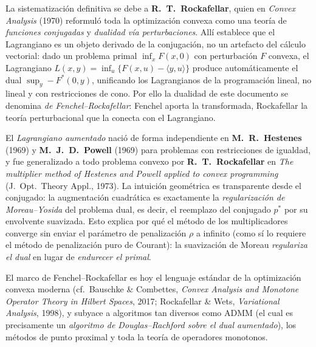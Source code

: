 \documentclass[12pt]{book}
\theoremstyle{definition}
\theoremstyle{plain}
\theoremstyle{remark}
\begin{document}
La sistematización definitiva se debe a
\textbf{R.~T.~Rockafellar}, quien en \textit{Convex Analysis}
(1970) reformuló toda la optimización convexa como una teoría de
\emph{funciones conjugadas} y \emph{dualidad vía perturbaciones}.
Allí establece que el Lagrangiano es un objeto derivado de la
conjugación, no un artefacto del cálculo vectorial: dado un
problema primal $\inf_x F(x,0)$ con perturbación $F$ convexa, el
Lagrangiano $L(x,y)=\inf_u\{F(x,u)-\langle y,u\rangle\}$ produce
automáticamente el dual $\sup_y -F^*(0,y)$, unificando los
Lagrangianos de la programación lineal, no lineal y con
restricciones de cono.  Por ello la dualidad de este documento se
denomina \emph{de Fenchel--Rockafellar}: Fenchel aporta la
transformada, Rockafellar la teoría perturbacional que la conecta
con el Lagrangiano.

El \emph{Lagrangiano aumentado} nació de forma independiente en
\textbf{M.~R.~Hestenes} (1969) y \textbf{M.~J.~D.~Powell} (1969)
para problemas con restricciones de igualdad, y fue generalizado a
todo problema convexo por \textbf{R.~T.~Rockafellar} en
\textit{The multiplier method of Hestenes and Powell applied to
convex programming} (J.\ Opt.\ Theory Appl., 1973).  La
intuición geométrica es transparente desde el conjugado: la
augmentación cuadrática es exactamente la \emph{regularización de
Moreau--Yosida} del problema dual, es decir, el reemplazo del
conjugado $p^*$ por su envolvente suavizada.  Esto explica por qué
el método de los multiplicadores converge sin enviar el parámetro
de penalización $\rho$ a infinito (como sí lo requiere el método
de penalización puro de Courant): la suavización de Moreau
\emph{regulariza el dual} en lugar de \emph{endurecer el primal}.

El marco de Fenchel--Rockafellar es hoy el lenguaje estándar de la
optimización convexa moderna (cf.\ Bauschke \& Combettes,
\textit{Convex Analysis and Monotone Operator Theory in Hilbert
Spaces}, 2017; Rockafellar \& Wets, \textit{Variational
Analysis}, 1998), y subyace a algoritmos tan diversos como
ADMM (el cual es precisamente un \emph{algoritmo de Douglas--Rachford
sobre el dual aumentado}), los métodos de punto proximal y toda la
teoría de operadores monotonos.  

\end{document}
